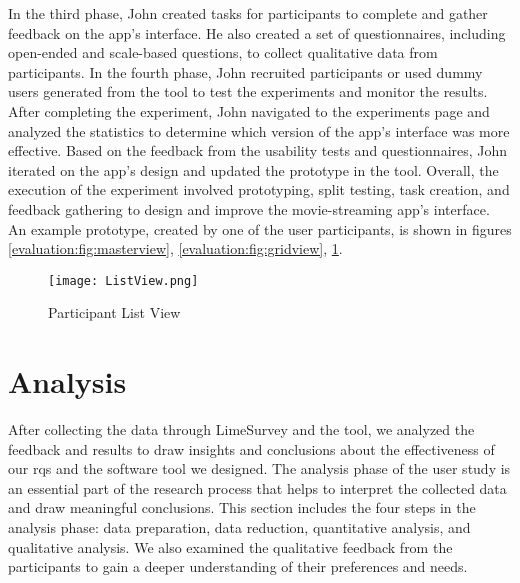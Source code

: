 In the third phase, John created tasks for participants to complete and gather feedback on the app's interface. 
He also created a set of questionnaires, including open-ended and scale-based questions, to collect qualitative data from participants.
In the fourth phase, John recruited participants or used dummy users generated from the tool to test the experiments and monitor the results. 
After completing the experiment, John navigated to the experiments page and analyzed the statistics to determine which version of the app's interface was more effective.
Based on the feedback from the usability tests and questionnaires, John iterated on the app's design and updated the prototype in the tool. 
Overall, the execution of the experiment involved prototyping, split testing, task creation, and feedback gathering to design and improve the movie-streaming app's interface. 
An example prototype, created by one of the user participants, is shown in figures \ref{evaluation:fig:masterview}, \ref{evaluation:fig:gridview}, \ref{evaluation:fig:listview}.
\begin{figure}[ht]
  \centering
  \texttt{[image: ListView.png]}
  \caption[Example Participant Prototype - Screen3]{Participant List View}
  \label{evaluation:fig:listview}
\end{figure}
\clearpage
\section{Analysis}
\label{evaluation:section:analysis}
After collecting the data through LimeSurvey and the tool, we analyzed the feedback and results to draw insights and conclusions about the effectiveness of our \ac{rq}s and the software tool we designed.
The analysis phase of the user study is an essential part of the research process that helps to interpret the collected data and draw meaningful conclusions. 
This section includes the four steps in the analysis phase: data preparation, data reduction, quantitative analysis, and qualitative analysis.
We also examined the qualitative feedback from the participants to gain a deeper understanding of their preferences and needs. 

